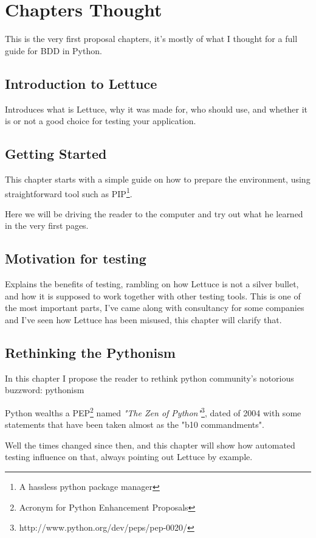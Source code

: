 \documentclass[letterpaper]{article}
\begin{document}
\section*{Chapters Thought}
This is the very first proposal chapters, it's mostly of what I
thought for a full guide for BDD in Python.

\subsection*{Introduction to Lettuce}
Introduces what is Lettuce, why it was made for, who should use, and
whether it is or not a good choice for testing your application.

\subsection*{Getting Started}
This chapter starts with a simple guide on how to prepare the environment, using straightforward tool such as PIP\footnote{A hassless python package manager}.

Here we will be driving the reader to the computer and try out what he
learned in the very first pages.

\subsection*{Motivation for testing}
Explains the benefits of testing, rambling on how Lettuce is not a
silver bullet, and how it is supposed to work together with other
testing tools.
This is one of the most important parts, I've came along with
consultancy for some companies and I've seen how Lettuce has been
misused, this chapter will clarify that.

\subsection*{Rethinking the Pythonism}
In this chapter I propose the reader to rethink python community's
notorious buzzword: pythonism

Python wealths a PEP\footnote{Acronym for Python Enhancement Proposals} named \textit{"The Zen of Python"}\footnote{http://www.python.org/dev/peps/pep-0020/}, dated of 2004 with some statements that have been taken almost as the "b10 commandments".

Well the times changed since then, and this chapter will show how
automated testing influence on that, always pointing out Lettuce by
example.
\end{document}
